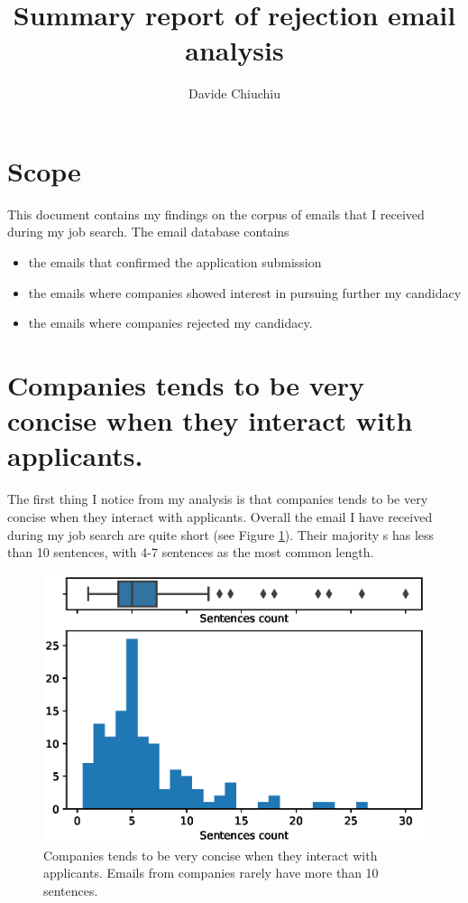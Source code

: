 \documentclass[12pt]{article}
\begin{document}
\title{Summary report of rejection email analysis}
\author{Davide Chiuchiu}

\maketitle

\section{Scope}
This document contains my findings on the corpus of emails that I received during my job search. The email database contains 
\begin{itemize}
	\item the emails that confirmed the application submission
	\item the emails where companies showed interest in pursuing further my candidacy
	\item the emails where companies rejected my candidacy.
\end{itemize}

\section{Companies tends to be very concise when they interact with applicants.}
The first thing I notice from my analysis is that companies tends to be very concise when they interact with applicants. Overall the email I have received during my job search are quite short (see Figure \ref{fig:email_lengths}). Their majority s has less than 10 sentences, with 4-7 sentences as the most common length. 

\begin{figure}
\includegraphics[width = \linewidth]{message_length_distribution.eps}
\caption{Companies tends to be very concise when they interact with applicants. Emails from companies rarely have more than 10 sentences. \label{fig:email_lengths}}
\end{figure}
\end{document}
